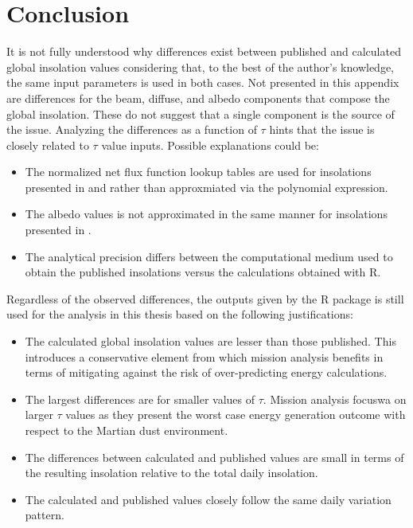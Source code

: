 \section{Conclusion}
It is not fully understood why differences exist between published and calculated global insolation values considering that, to the best of the author's knowledge, the same input parameters is used in both cases. Not presented in this appendix are differences for the beam, diffuse, and albedo components that compose the global insolation. These do not suggest that a single component is the source of the issue. Analyzing the differences as a function of $\tau$ hints that the issue is closely related to $\tau$ value inputs. Possible explanations could be:
\begin{itemize}
    \item The normalized net flux function lookup tables are used for insolations presented in  and  rather than approxmiated via the polynomial expression.
    \item The albedo values is not approximated in the same manner for insolations presented in .
    \item The analytical precision differs between the computational medium used to obtain the published insolations versus the calculations obtained with R.
\end{itemize}

Regardless of the observed differences, the outputs given by the R package is still used for the analysis in this thesis based on the following justifications:
\begin{itemize}
  \item The calculated global insolation values are lesser than those published. This introduces a conservative element from which mission analysis benefits in terms of mitigating against the risk of over-predicting energy calculations.
  \item The largest differences are for smaller values of $\tau$. Mission analysis focuswa on larger $\tau$ values as they present the worst case energy generation outcome with respect to the Martian dust environment.
  \item The differences between calculated and published values are small in terms of the resulting insolation relative to the total daily insolation.
  \item The calculated and published values closely follow the same daily variation pattern.
\end{itemize}
